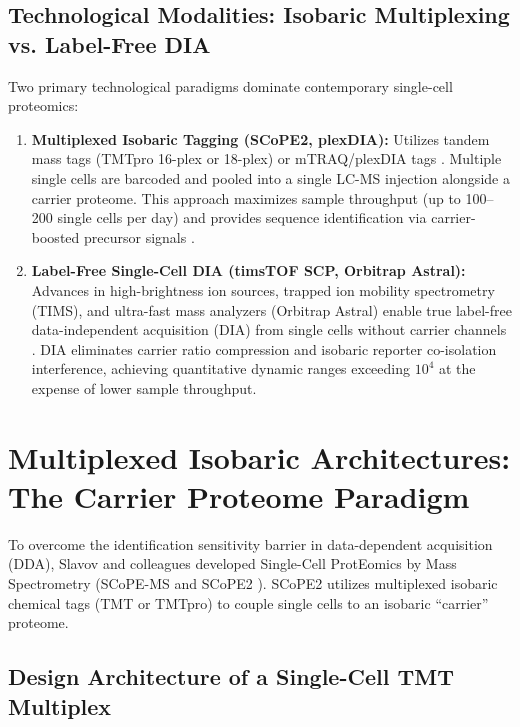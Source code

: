 \documentclass[11pt,twoside,openright]{book}
\begin{document}
\subsection{Technological Modalities: Isobaric Multiplexing vs. Label-Free DIA}

Two primary technological paradigms dominate contemporary single-cell proteomics:
\begin{enumerate}
    \item \textbf{Multiplexed Isobaric Tagging (SCoPE2, plexDIA):} Utilizes tandem mass tags (TMTpro 16-plex or 18-plex) or mTRAQ/plexDIA tags \cite{slavov2021scope2, derks2022increasing}. Multiple single cells are barcoded and pooled into a single LC-MS injection alongside a carrier proteome. This approach maximizes sample throughput (up to 100--200 single cells per day) and provides sequence identification via carrier-boosted precursor signals \cite{petelski2021multiplexed}.
    \item \textbf{Label-Free Single-Cell DIA (timsTOF SCP, Orbitrap Astral):} Advances in high-brightness ion sources, trapped ion mobility spectrometry (TIMS), and ultra-fast mass analyzers (Orbitrap Astral) enable true label-free data-independent acquisition (DIA) from single cells without carrier channels \cite{brunner2022ultra, thielert2023robust, furtwangler2022high, guzman2023astral}. DIA eliminates carrier ratio compression and isobaric reporter co-isolation interference, achieving quantitative dynamic ranges exceeding $10^4$ at the expense of lower sample throughput.
\end{enumerate}

\section{Multiplexed Isobaric Architectures: The Carrier Proteome Paradigm}

To overcome the identification sensitivity barrier in data-dependent acquisition (DDA), Slavov and colleagues developed Single-Cell ProtEomics by Mass Spectrometry (SCoPE-MS \cite{budnik2018scope} and SCoPE2 \cite{slavov2021scope2}). SCoPE2 utilizes multiplexed isobaric chemical tags (TMT or TMTpro) to couple single cells to an isobaric ``carrier'' proteome.

\subsection{Design Architecture of a Single-Cell TMT Multiplex}
\end{document}
